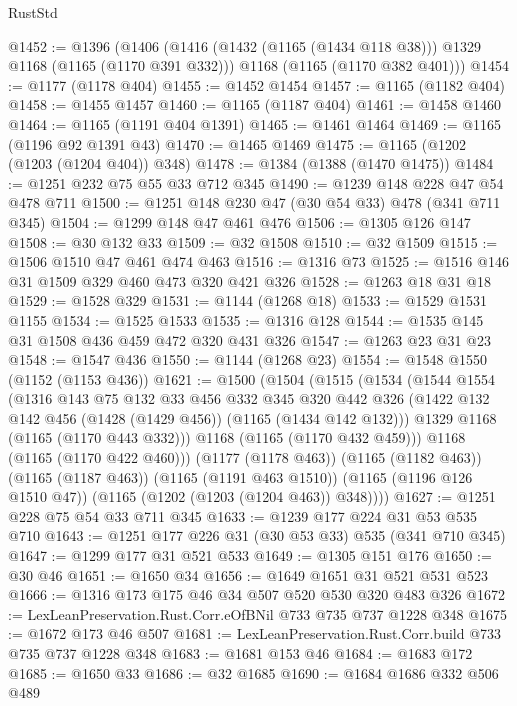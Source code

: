 \begin{lexlean}{RustStd}
\begin{coremodule}
@1452 := @1396
    (@1406
      (@1416 (@1432 (@1165 (@1434 @118 @38))) @1329 @1168 (@1165 (@1170 @391 @332)))
      @1168
      (@1165 (@1170 @382 @401)))
@1454 := @1177 (@1178 @404)
@1455 := @1452 @1454
@1457 := @1165 (@1182 @404)
@1458 := @1455 @1457
@1460 := @1165 (@1187 @404)
@1461 := @1458 @1460
@1464 := @1165 (@1191 @404 @1391)
@1465 := @1461 @1464
@1469 := @1165 (@1196 @92 @1391 @43)
@1470 := @1465 @1469
@1475 := @1165 (@1202 (@1203 (@1204 @404)) @348)
@1478 := @1384 (@1388 (@1470 @1475))
@1484 := @1251 @232 @75 @55 @33 @712 @345
@1490 := @1239 @148 @228 @47 @54 @478 @711
@1500 := @1251 @148 @230 @47 (@30 @54 @33) @478 (@341 @711 @345)
@1504 := @1299 @148 @47 @461 @476
@1506 := @1305 @126 @147
@1508 := @30 @132 @33
@1509 := @32 @1508
@1510 := @32 @1509
@1515 := @1506 @1510 @47 @461 @474 @463
@1516 := @1316 @73
@1525 := @1516 @146 @31 @1509 @329 @460 @473 @320 @421 @326
@1528 := @1263 @18 @31 @18
@1529 := @1528 @329
@1531 := @1144 (@1268 @18)
@1533 := @1529 @1531 @1155
@1534 := @1525 @1533
@1535 := @1316 @128
@1544 := @1535 @145 @31 @1508 @436 @459 @472 @320 @431 @326
@1547 := @1263 @23 @31 @23
@1548 := @1547 @436
@1550 := @1144 (@1268 @23)
@1554 := @1548 @1550 (@1152 (@1153 @436))
@1621 := @1500
    (@1504
      (@1515
        (@1534
          (@1544
            @1554
            (@1316
              @143
              @75
              @132
              @33
              @456
              @332
              @345
              @320
              @442
              @326
              (@1422 @132 @142 @456 (@1428 (@1429 @456)) (@1165 (@1434 @142 @132)))
              @1329
              @1168
              (@1165 (@1170 @443 @332)))
            @1168
            (@1165 (@1170 @432 @459)))
          @1168
          (@1165 (@1170 @422 @460)))
        (@1177 (@1178 @463))
        (@1165 (@1182 @463))
        (@1165 (@1187 @463))
        (@1165 (@1191 @463 @1510))
        (@1165 (@1196 @126 @1510 @47))
        (@1165 (@1202 (@1203 (@1204 @463)) @348))))
@1627 := @1251 @228 @75 @54 @33 @711 @345
@1633 := @1239 @177 @224 @31 @53 @535 @710
@1643 := @1251 @177 @226 @31 (@30 @53 @33) @535 (@341 @710 @345)
@1647 := @1299 @177 @31 @521 @533
@1649 := @1305 @151 @176
@1650 := @30 @46
@1651 := @1650 @34
@1656 := @1649 @1651 @31 @521 @531 @523
@1666 := @1316 @173 @175 @46 @34 @507 @520 @530 @320 @483 @326
@1672 := LexLeanPreservation.Rust.Corr.eOfBNil @733 @735 @737 @1228 @348
@1675 := @1672 @173 @46 @507
@1681 := LexLeanPreservation.Rust.Corr.build @733 @735 @737 @1228 @348
@1683 := @1681 @153 @46
@1684 := @1683 @172
@1685 := @1650 @33
@1686 := @32 @1685
@1690 := @1684 @1686 @332 @506 @489

\end{coremodule}
\end{lexlean}

